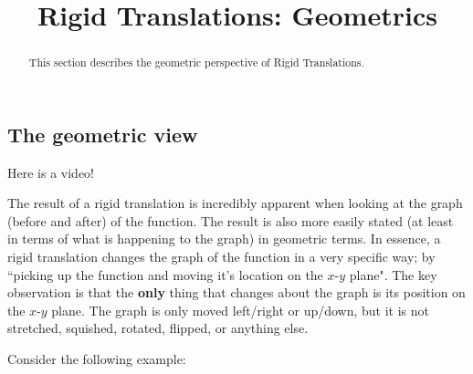 \documentclass{ximera}
\title{Rigid Translations: Geometrics}
\begin{document}
\begin{abstract}
    This section describes the geometric perspective of Rigid Translations.
\end{abstract}
\maketitle

\subsection*{The geometric view}

    Here is a video!
    
    
    The result of a rigid translation is incredibly apparent when looking at the graph (before and after) of the function. The result is also more easily stated (at least in terms of what is happening to the graph) in geometric terms. In essence, a rigid translation changes the graph of the function in a very specific way; by ``picking up the function and moving it's location on the $x$-$y$ plane". The key observation is that the \textbf{only} thing that changes about the graph is its position on the $x$-$y$ plane. The graph is only moved left/right or up/down, but it is not stretched, squished, rotated, flipped, or anything else. 
    
    Consider the following example:
    
    \begin{minipage}{\textwidth}
        \begin{center}
        \end{center}
    \end{minipage}
    
\end{document}
